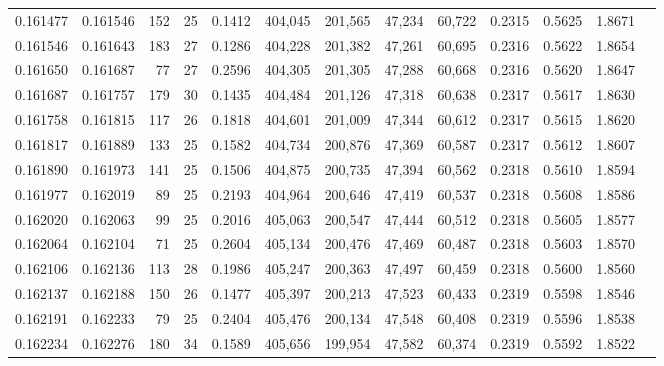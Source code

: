 \begin{tabular}{rrrrrrrrrrrrr}
0.161477 & 0.161546 & 152 &  25 &                                     0.1412 & 404,045 & 201,565 &  47,234 &  60,722 & 0.2315 & 0.5625 & 1.8671 \\
0.161546 & 0.161643 & 183 &  27 &                                     0.1286 & 404,228 & 201,382 &  47,261 &  60,695 & 0.2316 & 0.5622 & 1.8654 \\
0.161650 & 0.161687 &  77 &  27 &                                     0.2596 & 404,305 & 201,305 &  47,288 &  60,668 & 0.2316 & 0.5620 & 1.8647 \\
0.161687 & 0.161757 & 179 &  30 &                                     0.1435 & 404,484 & 201,126 &  47,318 &  60,638 & 0.2317 & 0.5617 & 1.8630 \\
0.161758 & 0.161815 & 117 &  26 &                                     0.1818 & 404,601 & 201,009 &  47,344 &  60,612 & 0.2317 & 0.5615 & 1.8620 \\
0.161817 & 0.161889 & 133 &  25 &                                     0.1582 & 404,734 & 200,876 &  47,369 &  60,587 & 0.2317 & 0.5612 & 1.8607 \\
0.161890 & 0.161973 & 141 &  25 &                                     0.1506 & 404,875 & 200,735 &  47,394 &  60,562 & 0.2318 & 0.5610 & 1.8594 \\
0.161977 & 0.162019 &  89 &  25 &                                     0.2193 & 404,964 & 200,646 &  47,419 &  60,537 & 0.2318 & 0.5608 & 1.8586 \\
0.162020 & 0.162063 &  99 &  25 &                                     0.2016 & 405,063 & 200,547 &  47,444 &  60,512 & 0.2318 & 0.5605 & 1.8577 \\
0.162064 & 0.162104 &  71 &  25 &                                     0.2604 & 405,134 & 200,476 &  47,469 &  60,487 & 0.2318 & 0.5603 & 1.8570 \\
0.162106 & 0.162136 & 113 &  28 &                                     0.1986 & 405,247 & 200,363 &  47,497 &  60,459 & 0.2318 & 0.5600 & 1.8560 \\
0.162137 & 0.162188 & 150 &  26 &                                     0.1477 & 405,397 & 200,213 &  47,523 &  60,433 & 0.2319 & 0.5598 & 1.8546 \\
0.162191 & 0.162233 &  79 &  25 &                                     0.2404 & 405,476 & 200,134 &  47,548 &  60,408 & 0.2319 & 0.5596 & 1.8538 \\
0.162234 & 0.162276 & 180 &  34 &                                     0.1589 & 405,656 & 199,954 &  47,582 &  60,374 & 0.2319 & 0.5592 & 1.8522 \\

\end{tabular}
